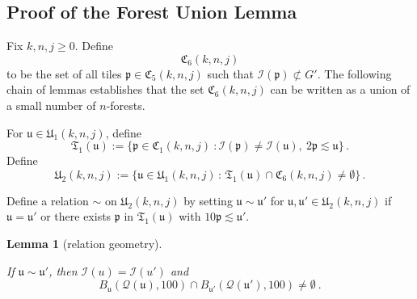 \documentclass[10pt,a4paper]{article}
\theoremstyle{plain}
\newtheorem{lemma}[theorem]{Lemma}
\theoremstyle{definition}
\numberwithin{equation}{subsection}
\newcommand{\fp}{{\mathfrak p}}
\newcommand{\fu}{{\mathfrak u}}
\newcommand{\fU}{{\mathfrak U}}
\newcommand{\fC}{{\mathfrak C}}
\newcommand{\scI}{{\mathcal{I}}} %
\newcommand{\fcc}{{\mathcal{Q}}}
\newcommand{\lean}[1]{}
\newcommand{\uses}[1]{}
\newcommand{\leanok}{}
\begin{document}
\subsection{Proof of the Forest Union Lemma}
\label{subsecforest}

Fix $k,n,j\ge 0$.
Define
$$
    \fC_6(k,n,j)
$$
to be the set of all tiles $\fp \in \fC_5(k,n,j)$ such that $\scI(\fp) \not\subset G'$. The following chain of lemmas
establishes that the set $\fC_6(k,n,j)$ can be written as a union of a small number of $n$-forests.

For $\fu\in \fU_1(k,n,j)$, define
\begin{equation}
    \label{eq-T1-def}
    \mathfrak{T}_1(\fu):= \{\fp \in \fC_1(k,n,j) \ : \scI(\fp)\neq \scI(\fu), \ 2\fp \lesssim \fu\}\,.
\end{equation}
Define
\begin{equation}
    \label{eq-U2-def}
    \fU_2(k,n,j) := \{ \fu \in \fU_1(k,n,j) \, : \, \mathfrak{T}_1(\fu) \cap \fC_6(k,n,j) \ne \emptyset\}\,.
\end{equation}

Define a relation $\sim$ on $\fU_2(k,n,j)$
by setting $\fu\sim \fu'$
for $\fu,\fu'\in \fU_2(k,n,j)$
if $\fu=\fu'$ or there exists $\fp$ in $\mathfrak{T}_1(\fu)$
with $10 \fp\lesssim \fu'$.

\begin{lemma}[relation geometry]
    \label{relation-geometry}
    \leanok
    \lean{URel.eq, URel.not_disjoint}
    \uses{wiggle-order-3}
    If $\fu \sim \fu'$, then $\scI(u) = \scI(u')$ and
    \begin{equation*}
        B_{\fu}(\fcc(\fu), 100) \cap B_{\fu'}(\fcc(\fu'), 100) \neq \emptyset\ .
    \end{equation*}
\end{lemma}
\end{document}

